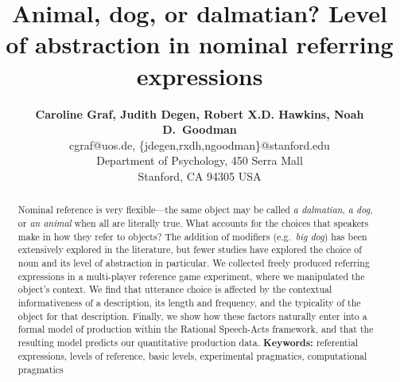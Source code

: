 \documentclass[10pt,letterpaper]{article}
\title{Animal, dog, or dalmatian? Level of abstraction in nominal referring expressions}
\author{{\large \bf Caroline Graf, Judith Degen, Robert X.D. Hawkins, Noah D.~Goodman} \\
  cgraf@uos.de, \{jdegen,rxdh,ngoodman\}@stanford.edu\\
  Department of Psychology, 450 Serra Mall \\
  Stanford, CA 94305 USA}
\newcommand{\red}[1]{\textcolor{Red}{#1}}
\begin{document}
\maketitle


\begin{abstract}


Nominal reference is very flexible---the same object may be called \emph{a dalmatian}, \emph{a dog}, or \emph{an animal} when all are literally true.
What accounts for the choices that speakers make in how they refer to objects?
The addition of modifiers (e.g.~\emph{big dog}) has been extensively explored in the literature, but fewer studies have explored the choice of noun and its level of abstraction in particular.
We collected freely produced referring expressions in a multi-player reference game experiment, where we manipulated the object's context.
We find that utterance choice is affected by the contextual informativeness of a description, its length and frequency, and the typicality of the object for that description.
Finally, we show how these factors naturally enter into a formal model of production within the Rational Speech-Acts framework, and that the resulting model predicts our quantitative production data.
\textbf{Keywords:} 
referential expressions, levels of reference, basic levels, experimental pragmatics, computational pragmatics
\end{abstract}
\end{document}
